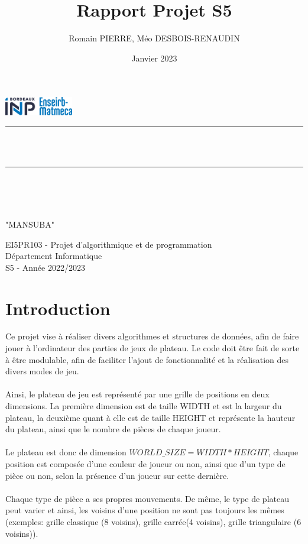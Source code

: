 \documentclass{article}
\title{Rapport Projet S5}
\author{Romain PIERRE, Méo DESBOIS-RENAUDIN}
\date{Janvier 2023}
\makeatletter
\let\mytitle\@title
\let\myauthor\@author
\let\mydate\@date
\makeatother
\begin{document}
\graphicspath{{tex/files/}}

\lstset{language=C, frame=single, basicstyle=\ttfamily, tabsize=4}

\begin{titlepage}
    \centering
    \vspace*{0.5 cm}
    \includegraphics[width=3cm]{logo.jpg}\\[1.0 cm]
    \rule{\linewidth}{0.2 mm} \\[0.4 cm]
    \huge\textbf{\mytitle}\\
    \rule{\linewidth}{0.2 mm} \\[1.5 cm]  
    \LARGE\myauthor\\[2.0 cm]
    \large\textbf{\mydate}\\[2 cm]
    \begin{center}
        "MANSUBA"
    \end{center}

    \vspace{5cm}
    \begin{center}
    EI5PR103 - Projet d'algorithmique et de programmation
    \\Département Informatique
    \\S5 - Année 2022/2023
    \end{center}
 \end{titlepage}

\tableofcontents

\newpage
\section{Introduction}
Ce projet vise à réaliser divers algorithmes et structures de données, afin de faire jouer
à l'ordinateur des parties de jeux de plateau. Le code doit être fait de sorte à être modulable,
afin de faciliter l'ajout de fonctionnalité et la réalisation des divers modes de jeu.
\\\\
Ainsi, le plateau de jeu est représenté par une grille de positions en deux dimensions. La première dimension
est de taille WIDTH et est la largeur du plateau, la deuxième quant à elle est de taille HEIGHT et représente 
la hauteur du plateau, ainsi que le nombre de pièces de chaque joueur.
\\\\
Le plateau est donc de dimension $WORLD\_SIZE = WIDTH * HEIGHT$, chaque position est composée d'une couleur de joueur 
ou non, ainsi que d'un type de pièce ou non, selon la présence d'un joueur sur cette dernière.
\\\\
Chaque type de pièce a ses propres mouvements. De même, le type de plateau peut varier et ainsi, les voisins d'une 
position ne sont pas toujours les mêmes (exemples: grille classique (8 voisins), grille carrée(4 voisins), grille 
triangulaire (6 voisins)).
\end{document}
